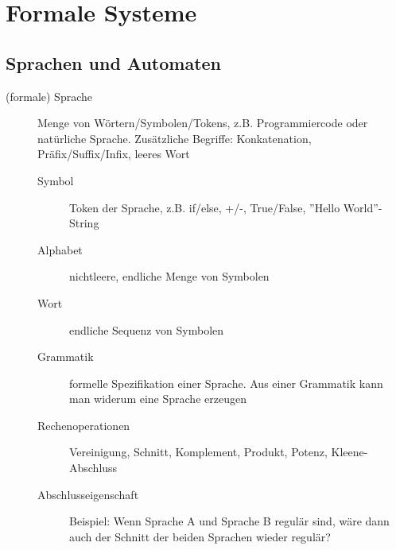 \section{Formale Systeme}
\subsection{Sprachen und Automaten}
\label{subsec:fs-sprachen-automaten}

\begin{description}
    \item[(formale) Sprache] Menge von Wörtern/Symbolen/Tokens, z.B. Programmiercode oder natürliche Sprache.
        Zusätzliche Begriffe: Konkatenation, Präfix/Suffix/Infix, leeres Wort 
        \begin{description}
            \item[Symbol] Token der Sprache, z.B. if/else, +/-, True/False, ''Hello World''-String
            \item[Alphabet] nichtleere, endliche Menge von Symbolen
            \item[Wort] endliche Sequenz von Symbolen
            \item[Grammatik] formelle Spezifikation einer Sprache. Aus einer Grammatik kann man widerum eine Sprache erzeugen 
            \item[Rechenoperationen] Vereinigung, Schnitt, Komplement, Produkt, Potenz, Kleene-Abschluss
            \item[Abschlusseigenschaft] Beispiel: Wenn Sprache A und Sprache B regulär sind, wäre dann auch der Schnitt der beiden Sprachen wieder regulär? 
        \end{description}


\end{description}
